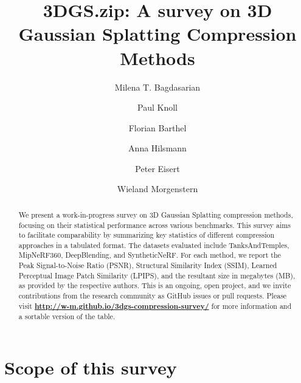 \documentclass{article}
\title{3DGS.zip: A survey on 3D Gaussian Splatting Compression Methods}
\author[1]{Milena T. Bagdasarian}
\author[1]{Paul Knoll}
\author[1,2]{Florian Barthel}
\author[1]{Anna Hilsmann}
\author[1,2]{Peter Eisert}
\author[1]{Wieland Morgenstern}
\affil[1]{Fraunhofer Heinrich Hertz, HHI}
\affil[2]{Humboldt University of Berlin}
\date{}
\begin{document}
\maketitle

\begin{abstract}

    We present a work-in-progress survey on 3D Gaussian Splatting\cite{kerbl3Dgaussians} compression methods, 
    focusing on their statistical performance across various benchmarks. This survey aims 
    to facilitate comparability by summarizing key statistics of different compression 
    approaches in a tabulated format. The datasets evaluated include TanksAndTemples\cite{TanksAndTemples}, 
    MipNeRF360\cite{MipNeRF360}, DeepBlending\cite{DeepBlending}, and SyntheticNeRF\cite{SyntheticNeRF}. For each method, we report the Peak 
    Signal-to-Noise Ratio (PSNR), Structural Similarity Index (SSIM), Learned Perceptual 
    Image Patch Similarity (LPIPS), and the resultant size in megabytes (MB), as 
    provided by the respective authors.
    This is an ongoing, open project, and we invite contributions from the research community 
    as GitHub issues or pull requests. Please visit \mbox{\bfseries\url{http://w-m.github.io/3dgs-compression-survey/}}
    for more information and a sortable version of the table.
    
\end{abstract}


\section{Scope of this survey}
\end{document}
